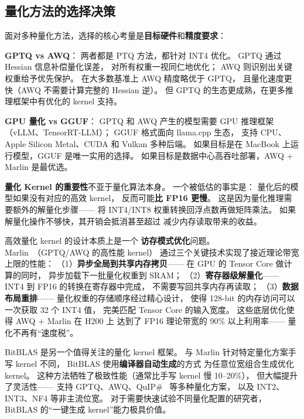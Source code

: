\subsection{量化方法的选择决策}

面对多种量化方法，选择的核心考量是\textbf{目标硬件}和\textbf{精度要求}：

\textbf{GPTQ vs AWQ}：
两者都是 PTQ 方法，都针对 INT4 优化。
GPTQ 通过 Hessian 信息补偿量化误差，
对所有权重一视同仁地优化；
AWQ 则识别出关键权重给予优先保护。
在大多数基准上 AWQ 精度略优于 GPTQ，
且量化速度更快（AWQ 不需要计算完整的 Hessian 逆）。
但 GPTQ 的生态更成熟，在更多推理框架中有优化的 kernel 支持。

\textbf{GPU 量化 vs GGUF}：
GPTQ 和 AWQ 产生的模型需要 GPU 推理框架（vLLM、TensorRT-LLM）；
GGUF 格式面向 llama.cpp 生态，
支持 CPU、Apple Silicon Metal、CUDA 和 Vulkan 多种后端。
如果目标是在 MacBook 上运行模型，GGUF 是唯一实用的选择。
如果目标是数据中心高吞吐部署，AWQ + Marlin 是最优选。

\textbf{量化 Kernel 的重要性}不亚于量化算法本身。
一个被低估的事实是：
量化后的模型如果没有对应的高效 kernel，
反而可能\textbf{比 FP16 更慢}。
这是因为量化推理需要额外的解量化步骤——
将 INT4/INT8 权重转换回浮点数再做矩阵乘法。
如果解量化操作不够快，其开销会抵消甚至超过
减少内存读取带来的收益。

高效量化 kernel 的设计本质上是一个
\textbf{访存模式优化}问题。
Marlin~\cite{frantar2024marlin}（GPTQ/AWQ 的高性能 kernel）
通过三个关键技术实现了接近理论带宽上限的性能：
（1）\textbf{异步全局到共享内存拷贝}——
在 GPU 的 Tensor Core 做计算的同时，
异步加载下一批量化权重到 SRAM；
（2）\textbf{寄存器级解量化}——
INT4 到 FP16 的转换在寄存器中完成，
不需要写回共享内存再读取；
（3）\textbf{数据布局重排}——
量化权重的存储顺序经过精心设计，
使得 128-bit 的内存访问可以一次获取 32 个 INT4 值，
完美匹配 Tensor Core 的输入宽度。
这些底层优化使得 AWQ + Marlin 在 H200 上
达到了 FP16 理论带宽的 90\% 以上利用率——
量化不再有``速度税''。

BitBLAS 是另一个值得关注的量化 kernel 框架。
与 Marlin 针对特定量化方案手写 kernel 不同，
BitBLAS 使用\textbf{编译器自动生成}的方式
为任意位宽组合生成优化 kernel。
这种方法牺牲了极致性能（通常比手写 kernel 慢 10--20\%），
但大幅提升了灵活性——
支持 GPTQ、AWQ、QuIP\#~\cite{chee2024quip} 等多种量化方案，
以及 INT2、INT3、NF4 等非主流位宽。
对于需要快速试验不同量化配置的研究者，
BitBLAS 的``一键生成 kernel''能力极具价值。


